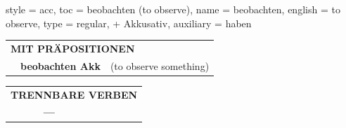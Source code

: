 \begin{verbentry}{
  style = {acc},
  toc = {beobachten (to observe)},
  name = {beobachten},
  english = {to observe},
  type = {regular, + Akkusativ},
  auxiliary = {haben}
}
\vspace{10pt}

\begin{tabular}{lll}
\multicolumn{3}{l}{\textbf{MIT PRÄPOSITIONEN}}\\
& \textbf{beobachten Akk} & (to observe something)\\
\end{tabular}
\hfill
\begin{tabular}{lll}
\multicolumn{3}{l}{\textbf{TRENNBARE VERBEN}}\\
& \textbf{---} & \\
\end{tabular}

\vspace{-5pt}
\end{verbentry}

